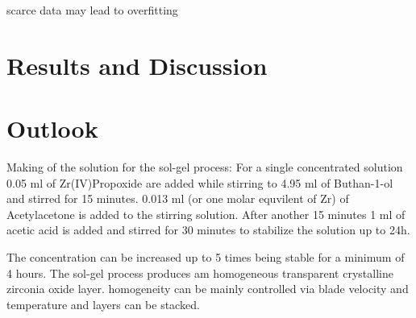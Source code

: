 \documentclass[a4paper]{article}
\begin{document}
scarce data may lead to overfitting\cite{Lecun1995conv}
\section{Results and Discussion}
\section{Outlook}




Making of the solution for the sol-gel process:
For a single concentrated solution 0.05 ml of Zr(IV)Propoxide are added while stirring to 4.95 ml of Buthan-1-ol and stirred for 15 minutes. 
0.013 ml (or one molar equvilent of Zr) of Acetylacetone is added to the stirring solution. 
After another 15 minutes 1 ml of acetic acid is added and stirred for 30 minutes to stabilize the solution up to 24h. 

The concentration can be increased up to 5 times being stable for a minimum of 4 hours. 
The sol-gel process produces am homogeneous transparent crystalline zirconia oxide layer. 
homogeneity can be mainly controlled via blade velocity and temperature and layers can be stacked.

\clearpage


\end{document}
